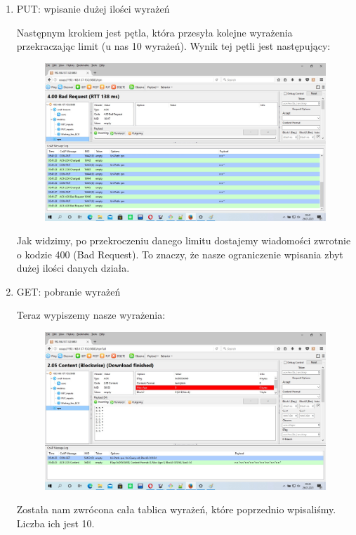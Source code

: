 \begin{enumerate}
\item PUT: wpisanie dużej ilości wyrażeń

Następnym krokiem jest pętla, która przesyła kolejne wyrażenia przekraczając limit (u nas 10 wyrażeń). Wynik tej pętli jest następujący:

\begin{figure}[h]
    \includegraphics[scale=0.4]{img/rpn_put_duza_ilosc.jpg}
\end{figure}
\vspace{0.5cm}

Jak widzimy, po przekroczeniu danego limitu dostajemy wiadomości zwrotnie o kodzie 400 (Bad Request). To znaczy, że nasze ograniczenie wpisania zbyt dużej ilości danych działa.

\item GET: pobranie wyrażeń

Teraz wypiszemy nasze wyrażenia:

\begin{figure}[h]
    \includegraphics[scale=0.4]{img/rpn_get_all.jpg}
\end{figure}
\vspace{0.5cm}

Została nam zwrócona cała tablica wyrażeń, które poprzednio wpisaliśmy. Liczba ich jest 10.
\end{enumerate}

